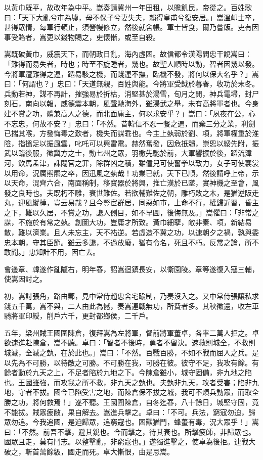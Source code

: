 \begin{pinyinscope}
以黃巾既平，故改年為中平。嵩奏請冀州一年田租，以贍飢民，帝從之。百姓歌曰：「天下大亂兮市為墟，母不保子兮妻失夫，賴得皇甫兮復安居。」嵩溫卹士卒，甚得眾情，每軍行頓止，須營幔修立，然後就舍帳。軍士皆食，爾乃嘗飯。吏有因事受賂者，嵩更以錢物賜之，吏懷慚，或至自殺。

嵩既破黃巾，威震天下，而朝政日亂，海內虛困。故信都令漢陽閻忠干說嵩曰：「難得而易失者，時也；時至不旋踵者，幾也。故聖人順時以動，智者因幾以發。今將軍遭難得之運，蹈易駭之機，而踐運不撫，臨機不發，將何以保大名乎？」嵩曰：「何謂也？」忠曰：「天道無親，百姓與能。今將軍受鉞於暮春，收功於末冬。兵動若神，謀不再計，摧強易於折枯，消堅甚於湯雪，旬月之閒，神兵電埽，封尸刻石，南向以報，威德震本朝，風聲馳海外，雖湯武之舉，未有高將軍者也。今身建不賞之功，體兼高人之德，而北面庸主，何以求安乎？」嵩曰：「夙夜在公，心不忘忠，何故不安？」忠曰：「不然。昔韓信不忍一餐之遇，而棄三分之業，利劍已揣其喉，方發悔毒之歎者，機失而謀乖也。今主上埶弱於劉、項，將軍權重於淮陰，指撝足以振風雲，叱吒可以興雷電。赫然奮發，因危扺穨，崇恩以綏先附，振武以臨後服，徵冀方之士，動七州之眾，羽檄先馳於前，大軍響振於後，蹈流漳河，飲馬孟津，誅閹官之罪，除群凶之積，雖僮兒可使奮拳以致力，女子可使褰裳以用命，況厲熊羆之卒，因迅風之埶哉！功業已就，天下已順，然後請呼上帝，示以天命，混齊六合，南面稱制，移寶器於將興，推亡漢於已墜，實神機之至會，風發之良時也。夫既朽不雕，衰世難佐。若欲輔難佐之朝，雕朽敗之木，是猶逆阪走丸，迎風縱棹，豈云易哉？且今豎宦群居，同惡如市，上命不行，權歸近習，昏主之下，難以久居，不賞之功，讒人側目，如不早圖，後悔無及。」嵩懼曰：「非常之謀，不施於有常之埶。創圖大功，豈庸才所致。黃巾細孽，敵非秦、項，新結易散，難以濟業。且人未忘主，天不祐逆。若虛造不冀之功，以速朝夕之禍，孰與委忠本朝，守其臣節。雖云多讒，不過放廢，猶有令名，死且不朽。反常之論，所不敢聞。」忠知計不用，因亡去。

會邊章、韓遂作亂隴右，明年春，詔嵩迴鎮長安，以衛園陵。章等遂復入寇三輔，使嵩因討之。

初，嵩討張角，路由鄴，見中常侍趙忠舍宅踰制，乃奏沒入之。又中常侍張讓私求錢五千萬，嵩不與，二人由此為憾，奏嵩連戰無功，所費者多。其秋徵還，收左車騎將軍印綬，削戶六千，更封都鄉侯，二千戶。

五年，梁州賊王國圍陳倉，復拜嵩為左將軍，督前將軍董卓，各率二萬人拒之。卓欲速進赴陳倉，嵩不聽。卓曰：「智者不後時，勇者不留決。速救則城全，不救則城滅，全滅之埶，在於此也。」嵩曰：「不然。百戰百勝，不如不戰而屈人之兵。是以先為不可勝，以待敵之可勝。不可勝在我，可勝在彼。彼守不足，我攻有餘。有餘者動於九天之上，不足者陷於九地之下。今陳倉雖小，城守固備，非九地之陷也。王國雖強，而攻我之所不救，非九天之埶也。夫埶非九天，攻者受害；陷非九地，守者不拔。國今已陷受害之地，而陳倉保不拔之城，我可不煩兵動眾，而取全勝之功，將何救焉！」遂不聽。王國圍陳倉，自冬迄春，八十餘日，城堅守固，竟不能拔。賊眾疲敝，果自解去。嵩進兵擊之。卓曰：「不可。兵法，窮寇勿迫，歸眾勿追。今我追國，是迫歸眾，追窮寇也。困獸猶鬥，蜂蠆有毒，況大眾乎！」嵩曰：「不然。前吾不擊，避其銳也。今而擊之，待其衰也。所擊疲師，非歸眾也。國眾且走，莫有鬥志。以整擊亂，非窮寇也。」遂獨進擊之，使卓為後拒。連戰大破之，斬首萬餘級，國走而死。卓大慚恨，由是忌嵩。


\end{pinyinscope}
